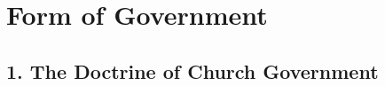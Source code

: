 \documentclass[
]{book}
\begin{document}
\mainmatter

\hypertarget{form-of-government}{%
\chapter*{Form of Government}\label{form-of-government}}

\hypertarget{the-doctrine-of-church-government}{%
\section*{1. The Doctrine of Church Government}\label{the-doctrine-of-church-government}}

\protect\hypertarget{part-main-body-2}{\href{}{}}
\protect\hypertarget{chapter-slug-1-the-doctrine-of-church-government}{\href{}{}}
\end{document}

